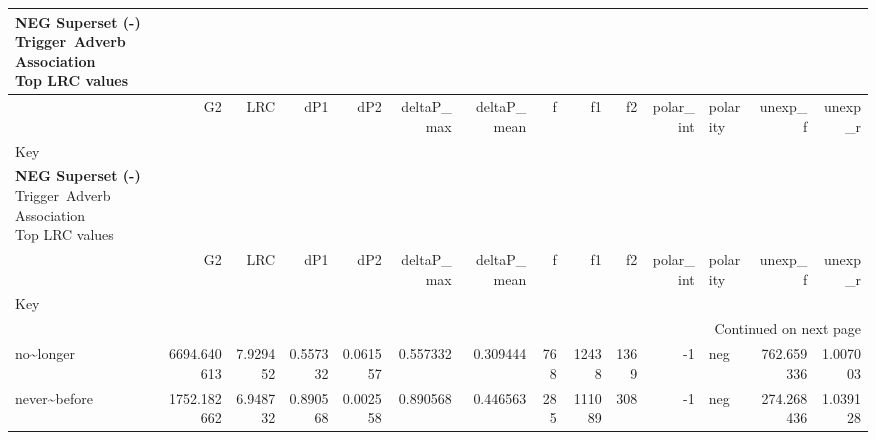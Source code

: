 
\begin{longtable}[ht]{lrrrrrrrrrrlrr}
\caption{\textbf{NEG Superset (-)}\\Trigger~Adverb Association\\Top LRC values} \label{trig-adv-AMtop-NEGSup} \\
\toprule
 & G2 & LRC & dP1 & dP2 & deltaP\_max & deltaP\_mean & f & f1 & f2 & polar\_int & polarity & unexp\_f & unexp\_r \\
Key &  &  &  &  &  &  &  &  &  &  &  &  &  \\
\midrule
\endfirsthead
\caption[]{\textbf{NEG Superset (-)}\\Trigger~Adverb Association\\Top LRC values} \\
\toprule
 & G2 & LRC & dP1 & dP2 & deltaP\_max & deltaP\_mean & f & f1 & f2 & polar\_int & polarity & unexp\_f & unexp\_r \\
Key &  &  &  &  &  &  &  &  &  &  &  &  &  \\
\midrule
\endhead
\midrule
\multicolumn{14}{r}{Continued on next page} \\
\midrule
\endfoot
\bottomrule
\endlastfoot
no\textasciitilde longer & {\cellcolor[HTML]{D9C4E0}} \color[HTML]{000000} 6694.640613 & {\cellcolor[HTML]{67001F}} \color[HTML]{F1F1F1} 7.929452 & {\cellcolor[HTML]{E72C8C}} \color[HTML]{F1F1F1} 0.557332 & {\cellcolor[HTML]{DECEE5}} \color[HTML]{000000} 0.061557 & {\cellcolor[HTML]{E6318F}} \color[HTML]{F1F1F1} 0.557332 & {\cellcolor[HTML]{DE2177}} \color[HTML]{F1F1F1} 0.309444 & {\cellcolor[HTML]{F6F3F9}} \color[HTML]{000000} 768 & {\cellcolor[HTML]{F6F3F9}} \color[HTML]{000000} 12438 & {\cellcolor[HTML]{F6F3F8}} \color[HTML]{000000} 1369 & {\cellcolor[HTML]{F7F4F9}} \color[HTML]{000000} -1 & neg & {\cellcolor[HTML]{EEEAF4}} \color[HTML]{000000} 762.659336 & {\cellcolor[HTML]{F7F4F9}} \color[HTML]{000000} 1.007003 \\
never\textasciitilde before & {\cellcolor[HTML]{F0ECF5}} \color[HTML]{000000} 1752.182662 & {\cellcolor[HTML]{C81054}} \color[HTML]{F1F1F1} 6.948732 & {\cellcolor[HTML]{67001F}} \color[HTML]{F1F1F1} 0.890568 & {\cellcolor[HTML]{F7F4F9}} \color[HTML]{000000} 0.002558 & {\cellcolor[HTML]{67001F}} \color[HTML]{F1F1F1} 0.890568 & {\cellcolor[HTML]{67001F}} \color[HTML]{F1F1F1} 0.446563 & {\cellcolor[HTML]{F7F4F9}} \color[HTML]{000000} 285 & {\cellcolor[HTML]{F2EFF6}} \color[HTML]{000000} 111089 & {\cellcolor[HTML]{F7F4F9}} \color[HTML]{000000} 308 & {\cellcolor[HTML]{F7F4F9}} \color[HTML]{000000} -1 & neg & {\cellcolor[HTML]{F4F0F7}} \color[HTML]{000000} 274.268436 & {\cellcolor[HTML]{F7F4F9}} \color[HTML]{000000} 1.039128 \\

\end{longtable}
